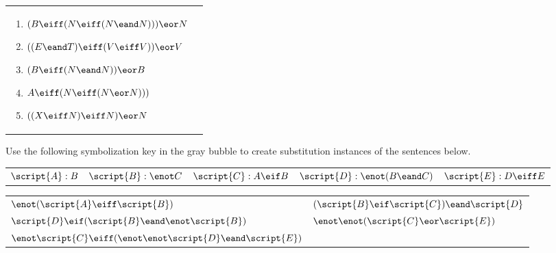 \begin{exercises}
\begin{longtabu}{p{2.5in}p{2.5in}}
\begin{flushleft}
\begin{enumerate}[label=\alph*.]
\item 	$(B \eiff (N \eiff (N \eand N))) \eor N  			$ %
\item 	$((E \eand T) \eiff (V \eiff V )) \eor V  			$  %
\item 	$ (B \eiff (N \eand N)) \eor B			$  %
\item 	$A \eiff (N \eiff (N \eor N)))			$ %
\item 	$((X \eiff N) \eiff N) \eor N			$ %
\end{enumerate}
\end{flushleft}
\end{longtabu}
\end{exercises}

\noindent\problempart Use the following symbolization key in the gray bubble to create substitution instances of the sentences below.

\begin{mdframed}[style=mytablebox] 
\begin{longtabu}{X[.5]X[.5]X[1]X[1]X[1]} 
$\script{A}: B$ 	& 	$\script{B}: \enot C$  	& $\script{C}: A \eif B$ &
$\script{D}:\enot (B \eand C)$  & $\script{E}: D \eiff E$
\end{longtabu}
\end{mdframed}

\begin{exercises}
\begin{longtabu}{X[1,l,m]X[1,p,m]} 
\item $\enot( \script{A} \eiff \script{B})$ 
&

\item $(\script{B} \eif \script{C}) \eand \script{D}$ 
\\
\item $\script{D} \eif (\script{B} \eand \enot \script{B}) $ 
&
\item $\enot \enot (\script{C} \eor \script{E})$ 
\\
\item $\enot \script{C} \eiff (\enot \enot \script{D} \eand \script{E})$ 

\end{longtabu}
\end{exercises}



